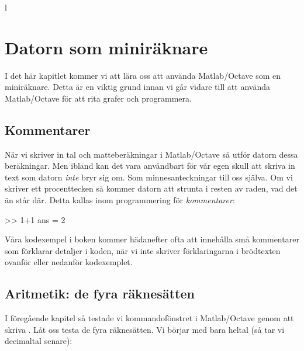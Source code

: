 l%
%
%

\chapter{Datorn som miniräknare}\label{ch:datorn_som_raknemaskin}

I det här kapitlet kommer vi att lära oss att använda Matlab/Octave som en miniräknare. Detta är en viktig grund innan vi går vidare till att använda Matlab/Octave för att rita grafer och programmera.


\section{Kommentarer}

När vi skriver in tal och matteberäkningar i Matlab/Octave så utför datorn dessa beräkningar. Men ibland kan det vara användbart för vår egen skull att skriva in text som datorn \emph{inte} bryr sig om. Som minnesanteckningar till oss själva. Om vi skriver ett procenttecken \cw{\%} så kommer datorn att strunta i resten av raden, vad det än står där. Detta kallas inom programmering för \emph{kommentarer}:

\begin{matlab}[caption={Vår första kommentar},label={}]
>> 1+1 %
ans = 2
\end{matlab}

Våra kodexempel i boken kommer hädanefter ofta att innehålla små kommentarer som förklarar detaljer i koden, när vi inte skriver förklaringarna i brödtexten ovanför eller nedanför kodexemplet.
\newpage
\section{Aritmetik: de fyra räknesätten}
I föregående kapitel så testade vi kommandofönstret i Matlab/Octave genom att skriva . Låt oss testa de fyra räknesätten. Vi börjar med bara heltal (så tar vi decimaltal senare):

